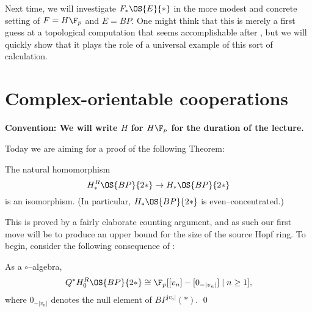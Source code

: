 Next time, we will investigate $F_* \OS{E}{*}$ in the more modest and concrete setting of $F = H\F_p$ and $E = BP$.  One might think that this is merely a first guess at a topological computation that seems accomplishable after , but we will quickly show that it plays the role of a universal example of this sort of calculation.



\section{Complex-orientable cooperations}\label{COableCoopnsII}

\begin{center}
\textbf{Convention: We will write $H$ for $H\F_p$ for the duration of the lecture.}
\end{center}

Today we are aiming for a proof of the following Theorem:

\begin{theorem}\label{HFpBPCooperationsTheorem}
The natural homomorphism \[H_*^R \OS{BP}{2*} \to H_* \OS{BP}{2*}\] is an isomorphism.  (In particular, $H_* \OS{BP}{2*}$ is even--concentrated.)
\end{theorem}

\noindent This is proved by a fairly elaborate counting argument, and as such our first move will be to produce an upper bound for the size of the source Hopf ring.  To begin, consider the following consequence of :

\begin{corollary}
As a $\circ$--algebra, \[Q^* H_0^R \OS{BP}{2*} \cong \F_p[[v_n] - [0_{-|v_n|}] \mid n \ge 1],\] where $0_{-|v_n|}$ denotes the null element of $BP^{|v_n|}(*)$. \qed
\end{corollary}

